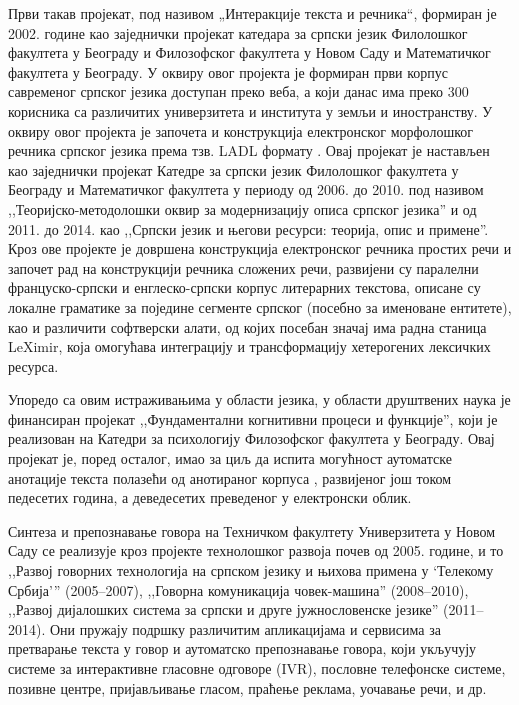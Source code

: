 \begin{multicols}{2}
Први такав пројекат, под називом „Интеракције текста и речника“, формиран је 2002. године као заједнички пројекат катедара за српски језик Филолошког факултета у Београду и Филозофског факултета у Новом Саду и Математичког факултета у Београду. У оквиру овог пројекта је формиран први корпус савременог српског језика \cite{KORPUS} доступан преко веба, а који данас има преко 300 корисника са различитих универзитета и института у земљи и иностранству. У оквиру овог пројекта је започета и конструкција електронског морфолошког речника српског језика према тзв. LADL формату \cite{KRSTEV}. Овај пројекат је настављен као заједнички пројекат Катедре за српски језик Филолошког факултета у Београду и Математичког факултета у периоду од 2006. до 2010. под називом ,,Теоријско-методолошки оквир за модернизацију описа српског језика'' и од 2011. до 2014. као ,,Српски језик и његови ресурси: теорија, опис и примене''. Кроз ове пројекте је довршена конструкција електронског речника простих речи и започет рад на конструкцији речника сложених речи, развијени су паралелни француско-српски и енглеско-српски корпус литерарних текстова, описане су локалне граматике за поједине сегменте српског (посебно за именоване ентитете), као и различити софтверски алати, од којих посебан значај има радна станица LeXimir, која омогућава интеграцију и трансформацију хетерогених лексичких ресурса. 

Упоредо са овим истраживањима у области језика, у области друштвених наука је финансиран пројекат ,,Фундаментални когнитивни процеси и функције'', који је реализован на Катедри за психологију Филозофског факултета у Београду. Овај пројекат је, поред осталог, имао за циљ да испита могућност аутоматске анотације текста полазећи од анотираног корпуса \cite{SRB_KORPUS}, развијеног још током педесетих година, а деведесетих преведеног у електронски облик. 

Синтеза и препознавање говора на Техничком факултету Универзитета у Новом Саду се реализује кроз пројекте технолошког развоја почев од 2005. године, и то ,,Развој говорних технологија на српском језику и њихова примена у ‘Телекому Србија’'' (2005--2007), ,,Говорна комуникација човек-машина'' (2008--2010),  ,,Развој дијалошких система за српски и друге јужнословенске језике'' (2011--2014).  Они пружају подршку различитим апликацијама и сервисима за претварање текста у говор и аутоматско препознавање говора, који укључују системе за интерактивне гласовне одговоре (IVR), пословне телефонске системе, позивне центре, пријављивање гласом, праћење реклама, уочавање речи, и др.


\end{multicols}
